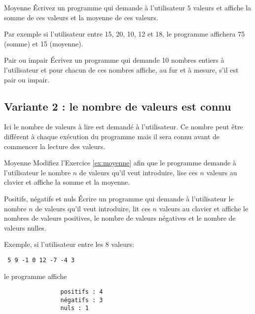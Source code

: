 \documentclass[a4paper,11pt]{article}
\begin{document}

		\begin{Exercice}{Moyenne}\label{ex:moyenne}
			\'Ecrivez un programme qui demande à l'utilisateur $5$ valeurs
			 et affiche la somme de ces valeurs et la moyenne de ces valeurs.
			 
			 Par exemple si l'utilisateur entre 15,  20, 10, 12 et 18, 
			 le programme affichera 75 (somme) et 15 (moyenne).
		\end{Exercice}

		\begin{Exercice}{Pair ou impair}\label{ex:pair}
			\'Ecrivez un programme qui demande 10 nombres entiers à l'utilisateur et 
			pour chacun de ces nombres affiche, au fur et à mesure, s'il est pair ou impair. 
		\end{Exercice}
	
	\subsection{Variante 2 : le nombre de valeurs est connu}
	
		Ici le nombre de valeurs à lire est demandé à l'utilisateur.
		Ce nombre peut être différent à chaque exécution du programme mais il sera connu
		avant de commencer la lecture des valeurs.
		 

		\begin{Exercice}{Moyenne}
			Modifiez l'Exercice \ref{ex:moyenne} afin que le programme demande
			 à l'utilisateur le nombre $n$ de valeurs qu'il veut introduire,
			lise ces $n$ valeurs au clavier et affiche la somme et la moyenne. 
		\end{Exercice}

		\begin{Exercice}{Positifs, négatifs et nuls}
			\'Ecrire un programme qui demande à l'utilisateur 
			le nombre $n$ de valeurs qu'il veut introduire,
			lit ces $n$ valeurs au clavier et affiche le nombres de valeurs positives, 
			le nombre de valeurs négatives et le nombre de valeurs nulles. 
			
			Exemple, si l'utilisateur entre les 8 valeurs:
			
			\texttt{ 5 9 -1 0 12 -7 -4 3}
			
			le programme affiche
			
			\begin{verbatim}
				positifs : 4
				négatifs : 3
				nuls : 1
			\end{verbatim}
		\end{Exercice}
\end{document}
